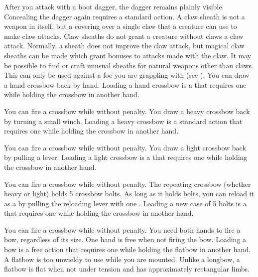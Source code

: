         After you attack with a boot dagger, the dagger remains plainly visible.
        Concealing the dagger again requires a standard action.
         A claw sheath is not a weapon in itself, but a covering over a single claw that a creature can use to make claw attacks. Claw sheaths do not grant a creature without claws a claw attack. Normally, a sheath does not improve the claw attack, but magical claw sheaths can be made which grant bonuses to attacks made with the claw. It may be possible to find or craft unusual sheaths for natural weapons other than claws.
         This  can only be used against a foe you are grappling with (see ).
         You can draw a hand crossbow back by hand. Loading a hand crossbow is a  that requires one  while holding the crossbow in another hand.
        \par You can fire a crossbow while \prone without penalty.
         You draw a heavy crossbow back by turning a small winch. Loading a heavy crossbow is a standard action that requires one  while holding the crossbow in another hand.
        \par You can fire a crossbow while \prone without penalty.
         You draw a light crossbow back by pulling a lever. Loading a light crossbow is a  that requires one  while holding the crossbow in another hand.
        \par You can fire a crossbow while \prone without penalty.
         The repeating crossbow (whether heavy or light) holds 5 crossbow bolts. As long as it holds bolts, you can reload it as a  by pulling the reloading lever with one . Loading a new case of 5 bolts is a  that requires one  while holding the crossbow in another hand.
        \par You can fire a crossbow while \prone without penalty.
         You need both hands to fire a bow, regardless of its size. One hand is free when not firing the bow. Loading a bow is a free action that requires one  while holding the flatbow in another hand. A flatbow is too unwieldy to use while you are mounted.
        Unlike a longbow, a flatbow is flat when not under tension and has approximately rectangular limbs.

